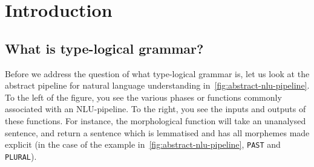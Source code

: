 \documentclass[a4paper]{article}
\begin{document}
\section{Introduction}

\subsection{What is type-logical grammar?}\label{sec:what-is-type-logical-grammar}
Before we address the question of what type-logical grammar is, let us
look at the abstract pipeline for natural language understanding
in~\autoref{fig:abstract-nlu-pipeline}.
%
%
%
To the left of the figure, you see the various phases or functions
commonly associated with an NLU-pipeline. To the right, you see the
inputs and outputs of these functions.
For instance, the morphological function will take an unanalysed
sentence, and return a sentence which is lemmatised and has all
morphemes made explicit (in the case of the example
in~\autoref{fig:abstract-nlu-pipeline}, \texttt{PAST} and
\texttt{PLURAL}).
\end{document}
